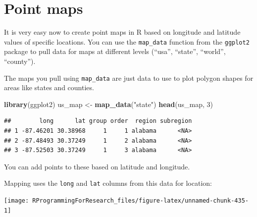 \documentclass[]{book}
\makeatletter
\newenvironment{Shaded}{\begin{snugshade}}{\end{snugshade}}
\newcommand{\KeywordTok}[1]{\textcolor[rgb]{0.13,0.29,0.53}{\textbf{{#1}}}}
\newcommand{\DataTypeTok}[1]{\textcolor[rgb]{0.13,0.29,0.53}{{#1}}}
\newcommand{\DecValTok}[1]{\textcolor[rgb]{0.00,0.00,0.81}{{#1}}}
\newcommand{\StringTok}[1]{\textcolor[rgb]{0.31,0.60,0.02}{{#1}}}
\newcommand{\NormalTok}[1]{{#1}}
\newenvironment{kframe}{%
\medskip{}
\setlength{\fboxsep}{.8em}
 \def\at@end@of@kframe{}%
 \ifinner\ifhmode%
  \def\at@end@of@kframe{\end{minipage}}%
  \begin{minipage}{\columnwidth}%
 \fi\fi%
 \def\FrameCommand##1{\hskip\@totalleftmargin \hskip-\fboxsep
 \colorbox{shadecolor}{##1}\hskip-\fboxsep
     \hskip-\linewidth \hskip-\@totalleftmargin \hskip\columnwidth}%
 \MakeFramed {\advance\hsize-\width
   \@totalleftmargin\z@ \linewidth\hsize
   \@setminipage}}%
 {\par\unskip\endMakeFramed%
 \at@end@of@kframe}
\renewenvironment{Shaded}{\begin{kframe}}{\end{kframe}}
\makeatother
\begin{document}
\section{Point maps}\label{point-maps}

It is very easy now to create point maps in R based on longitude and
latitude values of specific locations. You can use the
\texttt{map\_data} function from the \texttt{ggplot2} package to pull
data for maps at different levels (``usa'', ``state'', ``world'',
``county'').

The maps you pull using \texttt{map\_data} are just data to use to plot
polygon shapes for areas like states and counties.

\begin{Shaded}
\begin{Highlighting}[]
\KeywordTok{library}\NormalTok{(ggplot2)}
\NormalTok{us_map <-}\StringTok{ }\KeywordTok{map_data}\NormalTok{(}\StringTok{"state"}\NormalTok{)}
\KeywordTok{head}\NormalTok{(us_map, }\DecValTok{3}\NormalTok{)}
\end{Highlighting}
\end{Shaded}

\begin{verbatim}
##        long      lat group order  region subregion
## 1 -87.46201 30.38968     1     1 alabama      <NA>
## 2 -87.48493 30.37249     1     2 alabama      <NA>
## 3 -87.52503 30.37249     1     3 alabama      <NA>
\end{verbatim}

You can add points to these based on latitude and longitude.

Mapping uses the \texttt{long} and \texttt{lat} columns from this data
for location:

\begin{Shaded}
\end{Shaded}

\begin{center}\texttt{[image: RProgrammingForResearch\_files/figure-latex/unnamed-chunk-435-1]} \end{center}
\end{document}
